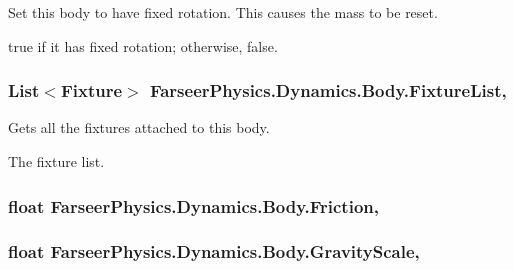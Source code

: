 Set this body to have fixed rotation. This causes the mass to be reset. 

{\ttfamily true} if it has fixed rotation; otherwise, {\ttfamily false}.\hypertarget{class_farseer_physics_1_1_dynamics_1_1_body_accbd764e3b9d421a0de41971adafe438}{
\subsubsection[{Fixture\+List}]{\setlength{\rightskip}{0pt plus 5cm}List$<${\bf Fixture}$>$ Farseer\+Physics.\+Dynamics.\+Body.\+Fixture\+List\hspace{0.3cm}{\ttfamily [get]}, {\ttfamily [set]}}}\label{class_farseer_physics_1_1_dynamics_1_1_body_accbd764e3b9d421a0de41971adafe438}


Gets all the fixtures attached to this body. 

The fixture list.\hypertarget{class_farseer_physics_1_1_dynamics_1_1_body_aaafb425a33fb4a2825570896d0f8a58e}{
\subsubsection[{Friction}]{\setlength{\rightskip}{0pt plus 5cm}float Farseer\+Physics.\+Dynamics.\+Body.\+Friction\hspace{0.3cm}{\ttfamily [get]}, {\ttfamily [set]}}}\label{class_farseer_physics_1_1_dynamics_1_1_body_aaafb425a33fb4a2825570896d0f8a58e}
\hypertarget{class_farseer_physics_1_1_dynamics_1_1_body_aaf6bfac0accc22e0ed08d4a11d3917c6}{
\subsubsection[{Gravity\+Scale}]{\setlength{\rightskip}{0pt plus 5cm}float Farseer\+Physics.\+Dynamics.\+Body.\+Gravity\+Scale\hspace{0.3cm}{\ttfamily [get]}, {\ttfamily [set]}}}\label{class_farseer_physics_1_1_dynamics_1_1_body_aaf6bfac0accc22e0ed08d4a11d3917c6}


